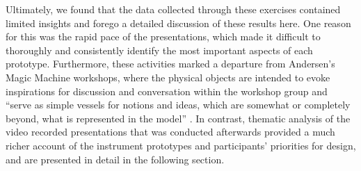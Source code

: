\documentclass[letterpaper, 12pt]{article}
\begin{document}
Ultimately, we found that the data collected through these exercises contained limited insights and forego a detailed discussion of these results here. One reason for this was the rapid pace of the presentations, which made it difficult to thoroughly and consistently identify the most important aspects of each prototype. 
Furthermore, these activities marked a departure from Andersen's Magic Machine workshops, where the physical objects are intended to evoke inspirations for discussion and conversation within the workshop group and ``serve as simple vessels for notions and ideas, which are somewhat or completely beyond, what is represented in the model'' \citep[p. 63]{Andersen2017}. In contrast, thematic analysis of the video recorded presentations that was conducted afterwards provided a much richer account of the instrument prototypes and participants' priorities for design, and are presented in detail in the following section.



\end{document}
